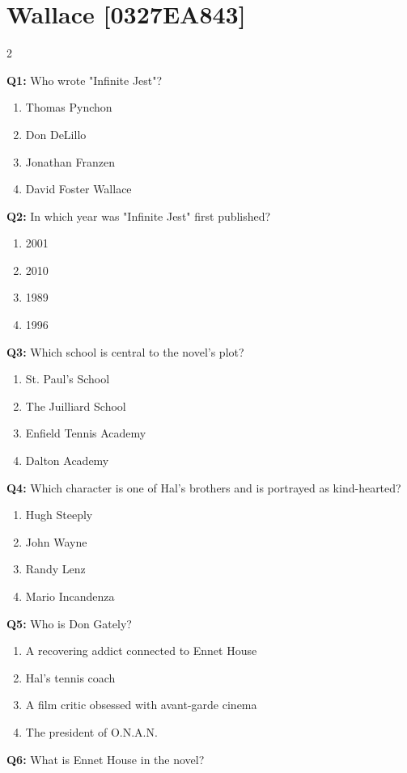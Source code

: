 \documentclass[10pt]{article}
\begin{document}
\section*{Wallace \footnotesize [0327EA843]}
\begin{multicols}{2}

\textbf{Q1:} Who wrote "Infinite Jest"?

\begin{enumerate}[label=\arabic*.]
\item Thomas Pynchon
\item Don DeLillo
\item Jonathan Franzen
\item David Foster Wallace
\end{enumerate}
\textbf{Q2:} In which year was "Infinite Jest" first published?

\begin{enumerate}[label=\arabic*.]
\item 2001
\item 2010
\item 1989
\item 1996
\end{enumerate}
\textbf{Q3:} Which school is central to the novel's plot?

\begin{enumerate}[label=\arabic*.]
\item St. Paul's School
\item The Juilliard School
\item Enfield Tennis Academy
\item Dalton Academy
\end{enumerate}
\textbf{Q4:} Which character is one of Hal's brothers and is portrayed as kind-hearted?

\begin{enumerate}[label=\arabic*.]
\item Hugh Steeply
\item John Wayne
\item Randy Lenz
\item Mario Incandenza
\end{enumerate}
\textbf{Q5:} Who is Don Gately?

\begin{enumerate}[label=\arabic*.]
\item A recovering addict connected to Ennet House
\item Hal's tennis coach
\item A film critic obsessed with avant-garde cinema
\item The president of O.N.A.N.
\end{enumerate}
\textbf{Q6:} What is Ennet House in the novel?


\end{multicols}
\end{document}
